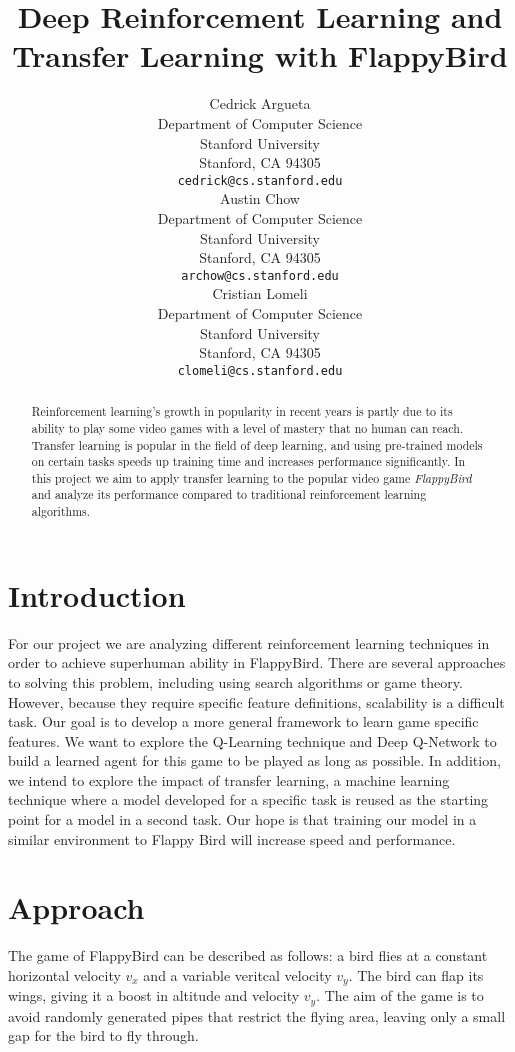 \documentclass{article}
\title{Deep Reinforcement Learning and Transfer Learning with FlappyBird}
\author{
  Cedrick Argueta \\%
  Department of Computer Science\\
  Stanford University\\
  Stanford, CA 94305 \\
  \texttt{cedrick@cs.stanford.edu} \\
  \And
  Austin Chow \\
  Department of Computer Science \\
  Stanford University\\
  Stanford, CA 94305 \\
  \texttt{archow@cs.stanford.edu} \\
  \And
  Cristian Lomeli\\
  Department of Computer Science \\
  Stanford University\\
  Stanford, CA 94305 \\
  \texttt{clomeli@cs.stanford.edu} \\
}
\begin{document}

\maketitle

\begin{abstract}

Reinforcement learning's growth in popularity in recent years is partly due to its ability to play some video games with a level of mastery that no human can reach. 
Transfer learning is popular in the field of deep learning, and using pre-trained models on certain tasks speeds up training time and increases performance significantly. 
In this project we aim to apply transfer learning to the popular video game \textit{FlappyBird} and analyze its performance compared to traditional reinforcement learning algorithms.
 
\end{abstract}


\section{Introduction}
For our project we are analyzing different reinforcement learning techniques in order to achieve superhuman ability in FlappyBird. 
There are several approaches to solving this problem, including using search algorithms or game theory. 
However, because they require specific feature definitions, scalability is a difficult task. 
Our goal is to develop a more general framework to learn game specific features. 
We want to explore the Q-Learning technique and Deep Q-Network to build a learned agent for this game to be played as long as possible. 
In addition, we intend to explore the impact of transfer learning, a machine learning technique where a model developed for a specific task is reused as the starting point for a model in a second task. 
Our hope is that training our model in a similar environment to Flappy Bird will increase speed and performance. 



\section{Approach}

The game of FlappyBird can be described as follows: a bird flies at a constant horizontal velocity $v_x$ and a variable veritcal velocity $v_y$. 
The bird can flap its wings, giving it a boost in altitude and velocity $v_y$.
The aim of the game is to avoid randomly generated pipes that restrict the flying area, leaving only a small gap for the bird to fly through. 
\end{document}
